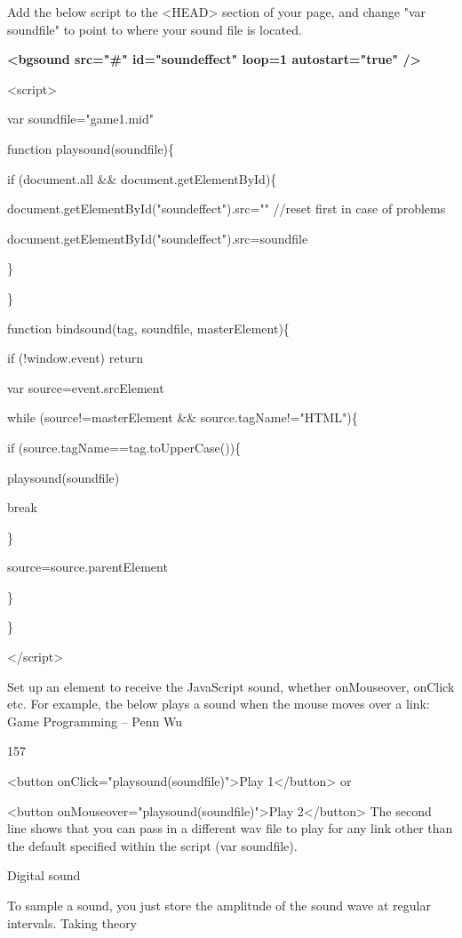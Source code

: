 \documentclass[
]{article}
\begin{document}
Add the below script to the \textless HEAD\textgreater{} section of your
page, and change "var soundfile" to point to where your sound file is
located.

\textbf{\textless bgsound src="\#" id="soundeffect" loop=1
autostart="true" /\textgreater{}}

\textless script\textgreater{}

var soundfile="game1.mid"

function playsound(soundfile)\{

if (document.all \&\& document.getElementById)\{

document.getElementById("soundeffect").src="" //reset first in case of
problems

document.getElementById("soundeffect").src=soundfile

\}

\}

function bindsound(tag, soundfile, masterElement)\{

if (!window.event) return

var source=event.srcElement

while (source!=masterElement \&\& source.tagName!="HTML")\{

if (source.tagName==tag.toUpperCase())\{

playsound(soundfile)

break

\}

source=source.parentElement

\}

\}

\textless/script\textgreater{}

Set up an element to receive the JavaScript sound, whether onMouseover,
onClick etc. For example, the below plays a sound when the mouse moves
over a link: Game Programming -- Penn Wu

157

\protect\hypertarget{index_split_010.htmlux5cux23p158}{}{}\textless button
onClick="playsound(soundfile)"\textgreater Play
1\textless/button\textgreater{} or

\textless button onMouseover="playsound(soundfile)"\textgreater Play
2\textless/button\textgreater{} The second line shows that you can pass
in a different wav file to play for any link other than the default
specified within the script (var soundfile).

Digital sound

To sample a sound, you just store the amplitude of the sound wave at
regular intervals. Taking theory
\end{document}
